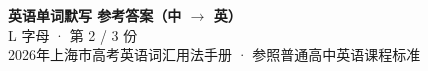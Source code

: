 \documentclass[10pt,a4paper]{article}
\begin{document}
\pagestyle{plain}

\begin{center}
{\LARGE\bfseries 英语单词默写 \quad 参考答案（中 $\to$ 英）}\\[0.22em]
{\large L 字母 · 第 2 / 3 份}\\[0.18em]
{\small 2026年上海市高考英语词汇用法手册 · 参照普通高中英语课程标准}
\end{center}

\vspace{0.2em}
\noindent{\color{rulegray}\rule{\textwidth}{0.8pt}}

\vspace{0.35em}

\vspace{0.25em}
\renewcommand{\arraystretch}{1.32}
\end{document}
